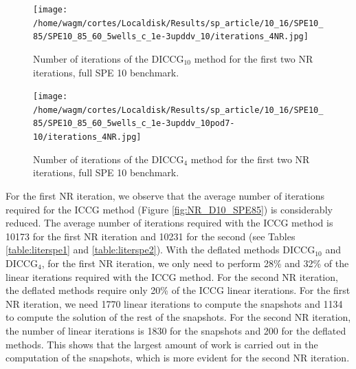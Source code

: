 \documentclass[12pt]{article}
\begin{document}
\begin{figure}[!ht]
\centering
\begin{minipage}{.4\textwidth}
\hspace{-1cm}
\texttt{[image: /home/wagm/cortes/Localdisk/Results/sp\_article/10\_16/SPE10\_85/SPE10\_85\_60\_5wells\_c\_1e-3upddv\_10/iterations\_4NR.jpg]}
\vspace{-1.3cm}
\caption{Number of iterations of the DICCG$_{10}$ method for the first two NR iterations, full SPE 10 benchmark.}
\label{fig:NR_D10_SPE85}
\end{minipage}%
\hspace{15mm}
\begin{minipage}{.4\textwidth}
\hspace{-1cm}
\texttt{[image: /home/wagm/cortes/Localdisk/Results/sp\_article/10\_16/SPE10\_85/SPE10\_85\_60\_5wells\_c\_1e-3upddv\_10pod7-10/iterations\_4NR.jpg]}
\vspace{-1.3cm}
\caption{Number of iterations of the DICCG$_{4}$ method for the first two NR iterations, full SPE 10 benchmark.}
\label{fig:NR_D4_SPE85}
\end{minipage}
\end{figure}

\begin{figure}[!h]
\centering

\end{figure}

For the first NR iteration, we observe that the average number of iterations required for the ICCG method (Figure \ref{fig:NR_D10_SPE85}) is considerably reduced. The average number of iterations required with the ICCG method is 10173 for the first NR iteration and 10231 for the second (see Tables \ref{table:literspe1} and \ref{table:literspe2}). With the deflated methods DICCG$_{10}$ and DICCG$_4$, for the first NR iteration, we only need to perform 28\% and 32\% of the linear iterations required with the ICCG method. For the second NR iteration, the deflated methods require only 20\% of the ICCG linear iterations. For the first NR iteration, we need 1770 linear iterations to compute the snapshots and 1134 to compute the solution of the rest of the snapshots. For the second NR iteration, the number of linear iterations is 1830 for the snapshots and 200 for the deflated methods. This shows that the largest amount of work is carried out in the computation of the snapshots, which is more evident for the second 
NR iteration.
\end{document}
